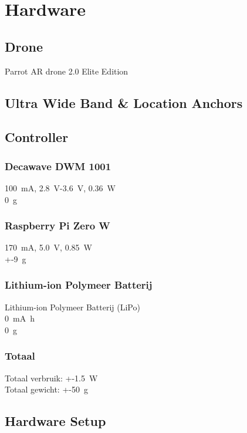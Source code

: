 \chapter{Hardware}
\section{Drone}
Parrot AR drone 2.0 Elite Edition

\section{Ultra Wide Band \& Location Anchors}


\section{Controller}
\subsection{Decawave DWM 1001}
\SI{100}{\mA}, \SI{2.8}{\V}-\SI{3.6}{\V}, \SI{0.36}{\W}\\
\SI{0}{\g}

\subsection{Raspberry Pi Zero W}
\SI{170}{\mA}, \SI{5.0}{\V}, \SI{0.85}{\W}\\
+-\SI{9}{\g}


\subsection{Lithium-ion Polymeer Batterij}
Lithium-ion Polymeer Batterij (LiPo)\\
\SI{0}{\mA\hour}\\
\SI{0}{\g}

\subsection{Totaal}
Totaal verbruik: +-\SI{1.5}{\W}\\
Totaal gewicht: +-\SI{50}{\g}

\section{Hardware Setup}
